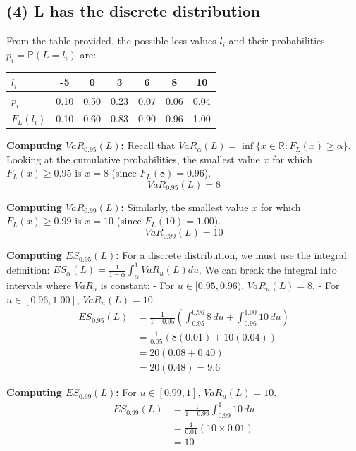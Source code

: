\subsection*{(4) L has the discrete distribution}

From the table provided, the possible loss values $l_i$ and their probabilities $p_i = \mathbb{P}(L = l_i)$ are:
\begin{table}[H]
\centering
\begin{tabular}{lcccccc}
\toprule
$l_i$ & -5 & 0 & 3 & 6 & 8 & 10 \\
\midrule
$p_i$ & 0.10 & 0.50 & 0.23 & 0.07 & 0.06 & 0.04 \\
$F_L(l_i)$ & 0.10 & 0.60 & 0.83 & 0.90 & 0.96 & 1.00 \\
\bottomrule
\end{tabular}
\end{table}

\textbf{Computing $VaR_{0.95}(L)$:}
Recall that $VaR_{\alpha}(L) = \inf\{x \in \mathbb{R} : F_L(x) \ge \alpha\}$. 
Looking at the cumulative probabilities, the smallest value $x$ for which $F_L(x) \ge 0.95$ is $x = 8$ (since $F_L(8) = 0.96$).
\begin{equation*}
VaR_{0.95}(L) = 8
\end{equation*}

\textbf{Computing $VaR_{0.99}(L)$:}
Similarly, the smallest value $x$ for which $F_L(x) \ge 0.99$ is $x = 10$ (since $F_L(10) = 1.00$).
\begin{equation*}
VaR_{0.99}(L) = 10
\end{equation*}

\textbf{Computing $ES_{0.95}(L)$:}
For a discrete distribution, we must use the integral definition: $ES_{\alpha}(L) = \frac{1}{1-\alpha}\int_{\alpha}^1 VaR_u(L) du$.
We can break the integral into intervals where $VaR_u$ is constant:
- For $u \in [0.95, 0.96)$, $VaR_u(L) = 8$.
- For $u \in [0.96, 1.00]$, $VaR_u(L) = 10$.
\begin{align*}
ES_{0.95}(L) &= \frac{1}{1 - 0.95} \left( \int_{0.95}^{0.96} 8 \, du + \int_{0.96}^{1.00} 10 \, du \right) \\
&= \frac{1}{0.05} \left( 8(0.01) + 10(0.04) \right) \\
&= 20 \left( 0.08 + 0.40 \right) \\
&= 20(0.48) = 9.6
\end{align*}

\textbf{Computing $ES_{0.99}(L)$:}
For $u \in [0.99, 1]$, $VaR_u(L) = 10$.
\begin{align*}
ES_{0.99}(L) &= \frac{1}{1 - 0.99} \int_{0.99}^1 10 \, du \\
&= \frac{1}{0.01} ( 10 \times 0.01 ) \\
&= 10
\end{align*}